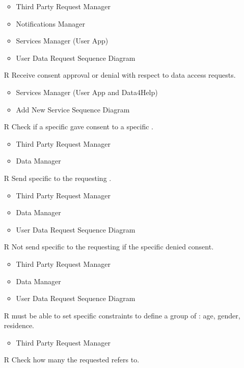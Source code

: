 \begin{itemize}
	\begin{itemize}
		\item Third Party Request Manager
		\item Notifications Manager
		\item Services Manager (User App)
		\item User Data Request Sequence Diagram
	\end{itemize}
	\item[R\subs{17}]Receive  consent approval or denial with respect to  data access requests.
	\begin{itemize}
		\item Services Manager (User App and Data4Help)
		\item Add New Service Sequence Diagram
	\end{itemize}
	\item[R\subs{18}]Check if a specific  gave consent to a specific .
	\begin{itemize}
		\item Third Party Request Manager
		\item Data Manager
	\end{itemize}
	\item[R\subs{19}]Send specific to the requesting .
	\begin{itemize}
		\item Third Party Request Manager
		\item Data Manager
		\item User Data Request Sequence Diagram
	\end{itemize}
	\item[R\subs{20}]Not send specific to the requesting  if the specific  denied consent.
	\begin{itemize}
		\item Third Party Request Manager
		\item Data Manager
		\item User Data Request Sequence Diagram
	\end{itemize}
	\item[R\subs{21}] must be able to set specific constraints to define a group of : age, gender, residence.
	\begin{itemize}
		\item Third Party Request Manager
	\end{itemize}
	\item[R\subs{22}]Check how many  the requested  refers to.

\end{itemize}
